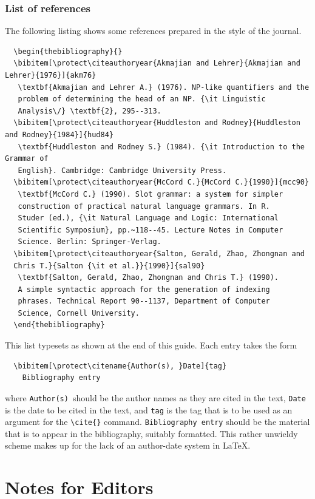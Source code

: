 \documentclass{CUP-JNL-NLP}
\begin{document}
\subsubsection{List of references}\label{fullref}

The following listing shows some references prepared in the style of the
journal.
%
{\fontsize{7}{9}\selectfont
\begin{verbatim}
  \begin{thebibliography}{}
  \bibitem[\protect\citeauthoryear{Akmajian and Lehrer}{Akmajian and Lehrer}{1976}]{akm76}
   \textbf{Akmajian and Lehrer A.} (1976). NP-like quantifiers and the
   problem of determining the head of an NP. {\it Linguistic
   Analysis\/} \textbf{2}, 295--313.
  \bibitem[\protect\citeauthoryear{Huddleston and Rodney}{Huddleston and Rodney}{1984}]{hud84}
   \textbf{Huddleston and Rodney S.} (1984). {\it Introduction to the Grammar of
   English}. Cambridge: Cambridge University Press.
  \bibitem[\protect\citeauthoryear{McCord C.}{McCord C.}{1990}]{mcc90}
   \textbf{McCord C.} (1990). Slot grammar: a system for simpler
   construction of practical natural language grammars. In R.
   Studer (ed.), {\it Natural Language and Logic: International
   Scientific Symposium}, pp.~118--45. Lecture Notes in Computer
   Science. Berlin: Springer-Verlag.
  \bibitem[\protect\citeauthoryear{Salton, Gerald, Zhao, Zhongnan and
  Chris T.}{Salton {\it et al.}}{1990}]{sal90}
   \textbf{Salton, Gerald, Zhao, Zhongnan and Chris T.} (1990).
   A simple syntactic approach for the generation of indexing
   phrases. Technical Report 90--1137, Department of Computer
   Science, Cornell University.
  \end{thebibliography}
\end{verbatim}}
%
This list typesets as shown at the end of this guide.
Each entry takes the form
%
\begin{verbatim}
  \bibitem[\protect\citename{Author(s), }Date]{tag}
    Bibliography entry
\end{verbatim}
%
where \verb"Author(s)"\ should be the author names as they are cited in
the text, \verb"Date" is the date to be cited in the text, and \verb"tag"
is the tag that is to be used as an argument for the \verb"\cite{}" command.
\verb"Bibliography entry" should be the
material that is to appear in the bibliography, suitably formatted.  This
rather unwieldy scheme makes up for the lack of an author-date system in
\LaTeX.

\section{Notes for Editors}
\end{document}
